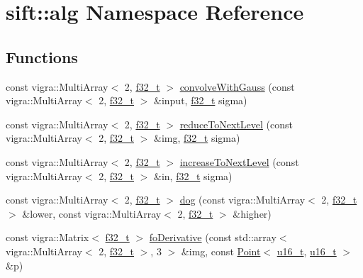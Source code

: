 \hypertarget{namespacesift_1_1alg}{}\section{sift\+:\+:alg Namespace Reference}
\label{namespacesift_1_1alg}
\subsection*{Functions}
\begin{DoxyCompactItemize}
\item 
const vigra\+::\+Multi\+Array$<$ 2, \hyperlink{types_8hpp_a37279f6a792de218cef11dff445d532a}{f32\+\_\+t} $>$ \hyperlink{namespacesift_1_1alg_aa9b5e76fbf3668e3f6684929a1698e85}{convolve\+With\+Gauss} (const vigra\+::\+Multi\+Array$<$ 2, \hyperlink{types_8hpp_a37279f6a792de218cef11dff445d532a}{f32\+\_\+t} $>$ \&input, \hyperlink{types_8hpp_a37279f6a792de218cef11dff445d532a}{f32\+\_\+t} sigma)
\item 
const vigra\+::\+Multi\+Array$<$ 2, \hyperlink{types_8hpp_a37279f6a792de218cef11dff445d532a}{f32\+\_\+t} $>$ \hyperlink{namespacesift_1_1alg_ad2f2df5248316f486c8750bfbf1025f9}{reduce\+To\+Next\+Level} (const vigra\+::\+Multi\+Array$<$ 2, \hyperlink{types_8hpp_a37279f6a792de218cef11dff445d532a}{f32\+\_\+t} $>$ \&img, \hyperlink{types_8hpp_a37279f6a792de218cef11dff445d532a}{f32\+\_\+t} sigma)
\item 
const vigra\+::\+Multi\+Array$<$ 2, \hyperlink{types_8hpp_a37279f6a792de218cef11dff445d532a}{f32\+\_\+t} $>$ \hyperlink{namespacesift_1_1alg_a607c534d47e8fe1495a9dbc64e44c195}{increase\+To\+Next\+Level} (const vigra\+::\+Multi\+Array$<$ 2, \hyperlink{types_8hpp_a37279f6a792de218cef11dff445d532a}{f32\+\_\+t} $>$ \&in, \hyperlink{types_8hpp_a37279f6a792de218cef11dff445d532a}{f32\+\_\+t} sigma)
\item 
const vigra\+::\+Multi\+Array$<$ 2, \hyperlink{types_8hpp_a37279f6a792de218cef11dff445d532a}{f32\+\_\+t} $>$ \hyperlink{namespacesift_1_1alg_ad2d6763924cfde4b445c09007aba3cf5}{dog} (const vigra\+::\+Multi\+Array$<$ 2, \hyperlink{types_8hpp_a37279f6a792de218cef11dff445d532a}{f32\+\_\+t} $>$ \&lower, const vigra\+::\+Multi\+Array$<$ 2, \hyperlink{types_8hpp_a37279f6a792de218cef11dff445d532a}{f32\+\_\+t} $>$ \&higher)
\item 
const vigra\+::\+Matrix$<$ \hyperlink{types_8hpp_a37279f6a792de218cef11dff445d532a}{f32\+\_\+t} $>$ \hyperlink{namespacesift_1_1alg_aee12a3c5f038d2d9a3fdb2a0074fd9b6}{fo\+Derivative} (const std\+::array$<$ vigra\+::\+Multi\+Array$<$ 2, \hyperlink{types_8hpp_a37279f6a792de218cef11dff445d532a}{f32\+\_\+t} $>$, 3 $>$ \&img, const \hyperlink{classsift_1_1Point}{Point}$<$ \hyperlink{types_8hpp_a4f53bd979bf45b1ce27e5f43e3a0d33b}{u16\+\_\+t}, \hyperlink{types_8hpp_a4f53bd979bf45b1ce27e5f43e3a0d33b}{u16\+\_\+t} $>$ \&p)

\end{DoxyCompactItemize}
